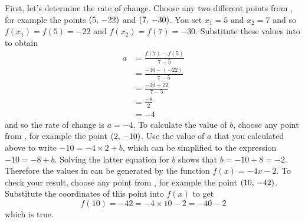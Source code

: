 \documentclass[a4paper,oneside,12pt]{article}
\begin{document}
\begin{solution}
First, let's determine the rate of change.  Choose any two different
points from , for
example the points $\left\lparen{5},\, {-22}\right\rparen$ and $\left\lparen{7},\, {-30}\right\rparen$.  You set
$x_1 = 5$ and $x_2 = 7$ and so $f(x_1) = f(5) = -22$ and
$f(x_2) = f(7) = -30$.  Substitute these values into
 to obtain
\begin{align*}
a
&=
\frac{
  f(7) - f(5)
}{
  7 - 5
} \\[4pt]
&=
\frac{
  -30 - (-22)
}{
  7 - 5
} \\[4pt]
&=
\frac{
  -30 + 22
}{
  7 - 5
} \\[4pt]
&=
\frac{
  -8
}{
  2
} \\[4pt]
&=
-4
\end{align*}
and so the rate of change is $a = -4$.  To calculate the value of $b$,
choose any point from ,
for example the point $\left\lparen{2},\, {-10}\right\rparen$.  Use the value of $a$ that you
calculated above to write $-10 = -4 \times 2 + b$, which can be
simplified to the expression $-10 = -8 + b$.  Solving the latter
equation for $b$ shows that $b = -10 + 8 = -2$.  Therefore the values
in  can be generated by
the function $f(x) = -4x - 2$.  To check your result, choose any point
from , for example the
point $\left\lparen{10},\, {-42}\right\rparen$.  Substitute the coordinates of this point
into $f(x)$ to get
\[
f(10)
=
-42
=
-4 \times 10 - 2
=
-40 - 2
\]
which is true.
\end{solution}

\begin{table}[!htbp]
\centering

\caption{%
  Some values of a linear function $f(x) = ax + b$.
}
\label{tab:function_values_a_third_b_minus_4}
\end{table}
\end{document}
